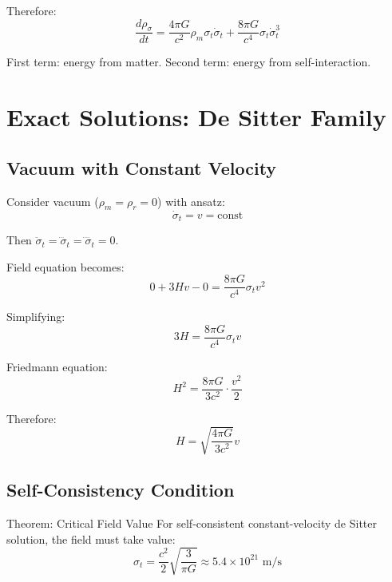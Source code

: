 \documentclass[11pt,a4paper]{article}
\theoremstyle{definition}
\theoremstyle{remark}
\begin{document}
		Therefore:
		\begin{equation}\label{eq:energy_exchange}
			\boxed{\frac{d\rho_\sigma}{dt} = \frac{4\pi G}{c^2}\rho_m\sigma_t\dot{\sigma}_t + \frac{8\pi G}{c^4}\sigma_t\dot{\sigma}_t^3}
		\end{equation}
	
	First term: energy from matter. Second term: energy from self-interaction.
	
	\section{Exact Solutions: De Sitter Family}
	
	\subsection{Vacuum with Constant Velocity}
	
	Consider vacuum ($\rho_m = \rho_r = 0$) with ansatz:
	\begin{equation}
		\dot{\sigma}_t = v = \text{const}
	\end{equation}
	
	Then $\ddot{\sigma}_t = \dddot{\sigma}_t = \ddddot{\sigma}_t = 0$.
	
	Field equation becomes:
	\begin{equation}
		0 + 3Hv - 0 = \frac{8\pi G}{c^4}\sigma_t v^2
	\end{equation}
	
	Simplifying:
	\begin{equation}\label{eq:balance}
		3H = \frac{8\pi G}{c^4}\sigma_t v
	\end{equation}
	
	Friedmann equation:
	\begin{equation}
		H^2 = \frac{8\pi G}{3c^2}\cdot\frac{v^2}{2}
	\end{equation}
	
	Therefore:
	\begin{equation}\label{eq:H_from_v}
		H = \sqrt{\frac{4\pi G}{3c^2}}v
	\end{equation}
	
	\subsection{Self-Consistency Condition}
	
	Theorem: Critical Field Value
		For self-consistent constant-velocity de Sitter solution, the field must take value:
		\begin{equation}\label{eq:critical_field}
			\boxed{\sigma_t = \frac{c^2}{2}\sqrt{\frac{3}{\pi G}} \approx 5.4 \times 10^{21} \text{ m/s}}
		\end{equation}
	
\end{document}
